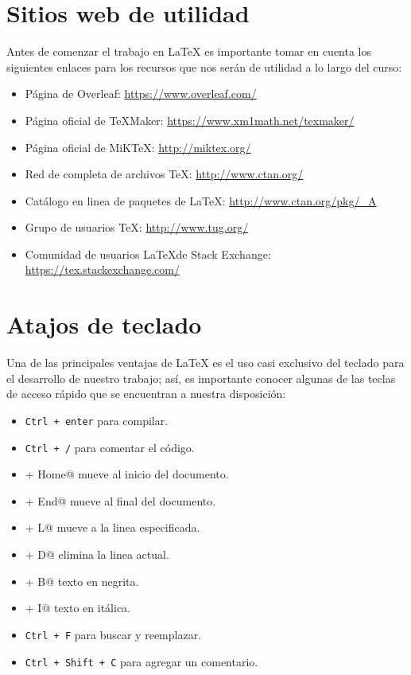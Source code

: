 \documentclass[a4,11pt]{aleph-notas}
\begin{document}
\encabezado

\informacion

\tableofcontents

\section{Sitios web de utilidad}

Antes de comenzar el trabajo en \LaTeX{} es importante tomar en cuenta los siguientes enlaces para los recursos que nos serán de utilidad a lo largo del curso:

\begin{itemize}[leftmargin=*]
    \item
        Página de Overleaf: \url{https://www.overleaf.com/}
    \item
        Página oficial de \TeX Maker: \url{https://www.xm1math.net/texmaker/}
   \item
        Página oficial de MiK\TeX: \url{http://miktex.org/}
   \item
        Red de completa de archivos \TeX: \url{http://www.ctan.org/}
   \item 
        Catálogo en linea de paquetes de \LaTeX: \url{http://www.ctan.org/pkg/_A}
   \item
        Grupo de usuarios \TeX: \url{http://www.tug.org/}
    \item
        Comunidad de usuarios \LaTeX de Stack Exchange: \url{https://tex.stackexchange.com/}
\end{itemize}

\section{Atajos de teclado}

Una de las principales ventajas de \LaTeX{} es el uso casi exclusivo del teclado para el desarrollo de nuestro trabajo; así, es importante conocer algunas de las teclas de acceso rápido que se encuentran a nuestra disposición:

  \begin{itemize}
    \item \verb"Ctrl + enter" para compilar.
    \item \verb"Ctrl + /" para comentar el código.
    \item \verb@Ctrl + Home@ mueve al inicio del documento.
    \item \verb@Ctrl + End@ mueve al final del documento.
    \item \verb@Ctrl + L@ mueve a la linea especificada.
    \item \verb@Ctrl + D@ elimina la linea actual.
    \item \verb@Ctrl + B@ texto en negrita.
    \item \verb@Ctrl + I@ texto en itálica.
    \item \verb"Ctrl + F" para buscar y reemplazar.
    \item \verb"Ctrl + Shift + C" para agregar un comentario.
  \end{itemize}
\end{document}
